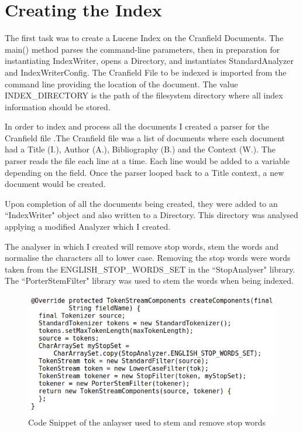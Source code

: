 \section{Creating the Index}

The first task was to create a Lucene Index on the Cranfield Documents. The main() method parses the command-line parameters, then in preparation for instantiating IndexWriter, opens a Directory, and instantiates StandardAnalyzer and IndexWriterConfig. The Cranfield File to be indexed is imported from the command line providing the location of the document. The value INDEX\_DIRECTORY is the path of the filesystem directory where all index information should be stored.  \par 

In order to index and process all the documents I created a parser for the Cranfield file .The Cranfield file was a list of documents where each document had a Title (I.), Author (A.), Bibliography (B.) and the Context (W.). The parser reads the file each line at a time. Each line would be added to a variable depending on the field. Once the parser looped back to a Title context, a new document would be created. \par 
	
Upon completion of all the documents being created, they were added to an ``IndexWriter" object and also written to a Directory. This directory was analysed applying a modified Analyzer which I created. \par

The analyser in which I created will remove stop words, stem the words and normalise the characters all to lower case. Removing the stop words were words taken from the ENGLISH\_STOP\_WORDS\_SET in the ``StopAnalyser" library. The ``PorterStemFilter" library was used to stem the words when being indexed.  \par

	\begin{figure}[ht!]
		\begin{center}
			\includegraphics[scale=.4 ]{2} 
			\caption{Code Snippet of the anlayser used to stem and remove stop words}
			\label{fig:1}
		\end{center}
	\end{figure} \par

